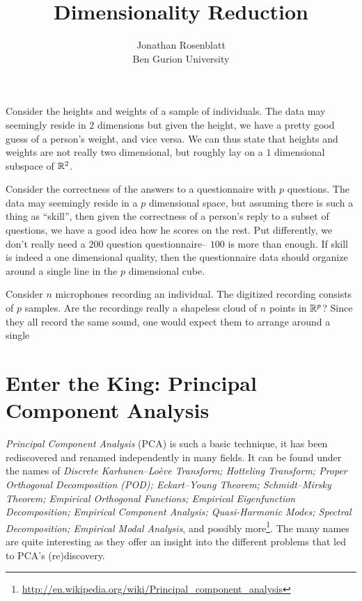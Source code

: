 \documentclass[12pt,a4paper]{article}
\author{Jonathan Rosenblatt \\ Ben Gurion University}
\title{Dimensionality Reduction}
\begin{document}
\maketitle

\begin{example}[BMI]
	\label{ex:bmi}
	Consider the heights and weights of a sample of individuals. 
	The data may seemingly reside in $2$ dimensions but given the height, we have a pretty good guess of a person's weight, and vice versa. 
	We can thus state that heights and weights are not really two dimensional, but roughly lay on a $1$ dimensional subspace of $\mathbb{R}^2$. 
\end{example}


\begin{example}[IQ]
	\label{ex:iq}
	Consider the correctness of the answers to a questionnaire with $p$ questions. 
	The data may seemingly reside in a $p$ dimensional space, but assuming there is such a thing as ``skill'', then given the correctness of a person's reply to a subset of questions, we have a good idea how he scores on the rest. 
	Put differently, we don't really need a $200$ question questionnaire-- $100$ is more than enough.
	If skill is indeed a one dimensional quality, then the questionnaire data should organize around a single line in the $p$ dimensional cube. 
\end{example}


\begin{example}
	\label{ex:blind-signal}
	Consider $n$ microphones recording an individual. 
	The digitized recording consists of $p$ samples. 
	Are the recordings really a shapeless cloud of $n$ points in $\mathbb{R}^p$?
	Since they all record the same sound, one would expect them to arrange around a single 
\end{example}
		
	






\section{Enter the King: Principal Component Analysis}
\label{sec:pca}

\emph{Principal Component Analysis} (PCA) is such a basic technique, it has been rediscovered and renamed independently in many fields. 
It can be found under the names of 
\emph{
	Discrete Karhunen–Loève Transform; 
	Hotteling Transform; 
	Proper Orthogonal Decomposition (POD); 
	Eckart–Young Theorem; 
	Schmidt–Mirsky Theorem;  
	Empirical Orthogonal Functions; 
	Empirical Eigenfunction Decomposition;  
	Empirical Component Analysis;  
	Quasi-Harmonic Modes;  
	Spectral Decomposition;  
	Empirical Modal Analysis}, 
and possibly more\footnote{\url{http://en.wikipedia.org/wiki/Principal_component_analysis} }.
The many names are quite interesting as they offer an insight into the different problems that led to PCA's (re)discovery.
\end{document}
